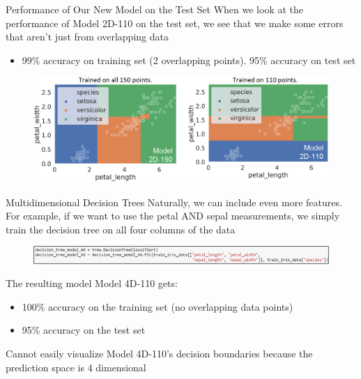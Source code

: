 \documentclass[aspectratio=169]{../latex_main/tntbeamer}  %
\begin{document}
	
	\begin{frame}{Performance of Our New Model on the Test Set}
	  When we look at the performance of Model 2D-110 on the test set, we see that we make some errors that aren’t just from overlapping data\\
	    \begin{itemize}
	        \item 99\% accuracy on training set (2 overlapping points). 95\% accuracy on test set
	    \end{itemize}
	    \begin{figure}
	        \centering
	        \includegraphics[scale=.4]{Bild31}
	    \end{figure}
	\end{frame}
	
	
	\begin{frame}{Multidimensional Decision Trees}
	  Naturally, we can include even more features. For example, if we want to use the petal AND sepal measurements, we simply train the decision tree on all four columns of the data\\
	  \begin{figure}
	        \centering
	        \includegraphics[scale=.6]{Bild32}
	    \end{figure}
	    The resulting model Model 4D-110 gets:
	    \begin{itemize}
	        \item 100\% accuracy on the training set (no overlapping data points)
            \item 95\% accuracy on the test set
	    \end{itemize}
	    Cannot easily visualize Model 4D-110’s decision   boundaries because the prediction space   is 4 dimensional
	\end{frame}
	
\end{document}
